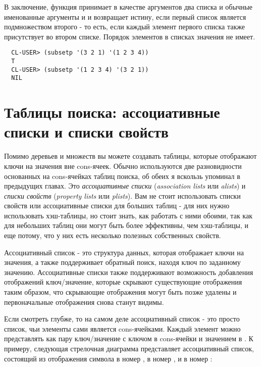 В заключение, функция  принимает в качестве аргументов два списка и обычные
именованные аргументы  и  и возвращает истину, если первый список
является подмножеством второго - то есть, если каждый элемент первого списка также
присутствует во втором списке.  Порядок элементов в списках значения не имеет.

\begin{verbatim}
  CL-USER> (subsetp '(3 2 1) '(1 2 3 4))
  T
  CL-USER> (subsetp '(1 2 3 4) '(3 2 1))
  NIL
\end{verbatim}


\section{Таблицы поиска: ассоциативные списки и списки свойств}

Помимо деревьев и множеств вы можете создавать таблицы, которые отображают ключи на
значения вне cons-ячеек. Обычно используются две разновидности основанных на cons-ячейках
таблиц поиска, об обеих я вскользь упоминал в предыдущих главах. Это \textit{ассоциативные
  списки} (\textit{association lists} или \textit{alists}) и \textit{списки свойств}
(\textit{property lists} или \textit{plists}). Вам не стоит использовать списки свойств
или ассоциативные списки для больших таблиц - для них нужно использовать хэш-таблицы, но
стоит знать, как работать с ними обоими, так как для небольших таблиц они могут быть более
эффективны, чем хэш-таблицы, и еще потому, что у них есть несколько полезных собственных
свойств.
 
Ассоциативный список - это структура данных, которая отображает ключи на значения, а также
поддерживает обратный поиск, находя ключ по заданному значению. Ассоциативные списки также
поддерживают возможность добавления отображений ключ/значение, которые скрывают
существующие отображения таким образом, что скрывающие отображения могут быть позже
удалены и первоначальные отображения снова станут видимы.

Если смотреть глубже, то на самом деле ассоциативный список - это просто список, чьи
элементы сами является cons-ячейками. Каждый элемент можно представлять как пару
ключ/значение с ключом в  cons-ячейки и значением в . К примеру,
следующая стрелочная диаграмма представляет ассоциативный список, состоящий из отображения
символа  в номер ,  в номер , и  в номер :


